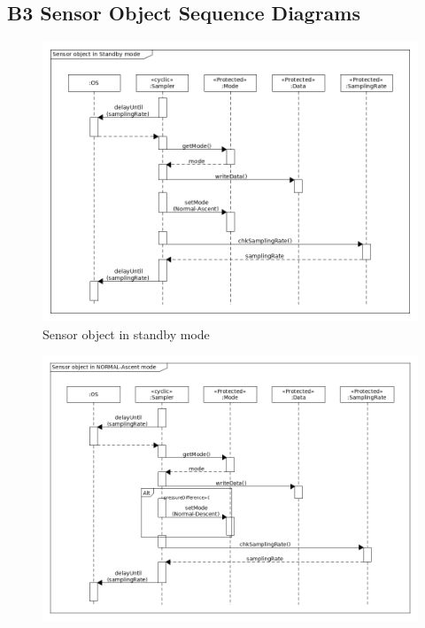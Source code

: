 \documentclass[a4paper,12pt,twoside]{article}
\providecommand{\DIFaddbeginFL}{} %
\providecommand{\DIFaddendFL}{} %
\providecommand{\DIFdelbeginFL}{} %
\providecommand{\DIFdelendFL}{} %
\newcommand{\DIFscaledelfig}{0.5}
\newlength{\DIFdelgraphicswidth} %
\newlength{\DIFdelgraphicsheight} %
\newcommand{\DIFaddincludegraphics}[2][]{{\color{blue}\fbox{\DIFOincludegraphics[#1]{#2}}}} %
\newcommand{\DIFdelincludegraphics}[2][]{%
\sbox{\DIFdelgraphicsbox}{\DIFOincludegraphics[#1]{#2}}%
\settoboxwidth{\DIFdelgraphicswidth}{\DIFdelgraphicsbox} %
\settoboxtotalheight{\DIFdelgraphicsheight}{\DIFdelgraphicsbox} %
\scalebox{\DIFscaledelfig}{%
\parbox[b]{\DIFdelgraphicswidth}{\usebox{\DIFdelgraphicsbox}\\[-\baselineskip] \rule{\DIFdelgraphicswidth}{0em}}\llap{\resizebox{\DIFdelgraphicswidth}{\DIFdelgraphicsheight}{%
\setlength{\unitlength}{\DIFdelgraphicswidth}%
\begin{picture}(1,1)%
\thicklines\linethickness{2pt} %
{\color[rgb]{1,0,0}\put(0,0){\framebox(1,1){}}}%
{\color[rgb]{1,0,0}\put(0,0){\line( 1,1){1}}}%
{\color[rgb]{1,0,0}\put(0,1){\line(1,-1){1}}}%
\end{picture}%
}\hspace*{3pt}}} %
} %
\DeclareRobustCommand{\DIFaddbeginFL}{\DIFOaddbeginFL \let\includegraphics\DIFaddincludegraphics} %
\DeclareRobustCommand{\DIFaddendFL}{\DIFOaddendFL \let\includegraphics\DIFOincludegraphics} %
\DeclareRobustCommand{\DIFdelbeginFL}{\DIFOdelbeginFL \let\includegraphics\DIFdelincludegraphics} %
\DeclareRobustCommand{\DIFdelendFL}{\DIFOaddendFL \let\includegraphics\DIFOincludegraphics} %
\begin{document}
\begin{landscape}
\subsection*{B3 Sensor Object Sequence Diagrams}
\begin{figure}[H]
    \centering
    \DIFdelbeginFL %
\DIFdelendFL \DIFaddbeginFL \includegraphics[height=0.9\textwidth]{appendix/img/sensor-seq-dia-a.png}
    \DIFaddendFL \caption{Sensor object in standby mode}
    \label{sensora}
\end{figure}
\begin{figure}[H]
    \centering
    \DIFdelbeginFL %
\DIFdelendFL \DIFaddbeginFL \includegraphics[height=0.9\textwidth]{appendix/img/sensor-seq-dia-b.png}

\end{figure}
\end{landscape}
\end{document}
